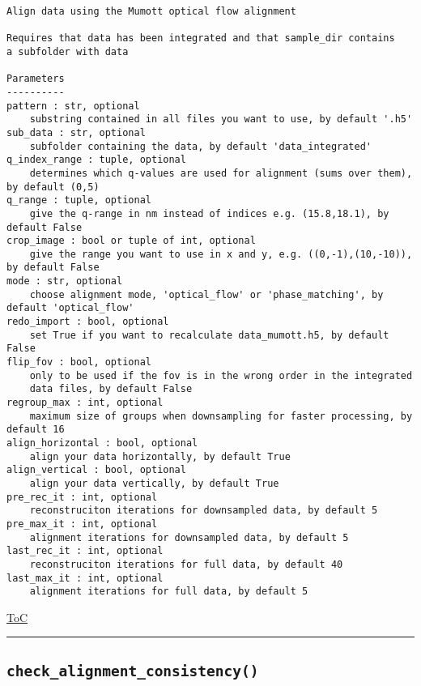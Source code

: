 \documentclass{article}
\begin{document}
\begin{lstlisting}[language=docstring]
Align data using the Mumott optical flow alignment

Requires that data has been integrated and that sample_dir contains
a subfolder with data

Parameters
----------
pattern : str, optional
    substring contained in all files you want to use, by default '.h5'
sub_data : str, optional
    subfolder containing the data, by default 'data_integrated'
q_index_range : tuple, optional
    determines which q-values are used for alignment (sums over them), by default (0,5)
q_range : tuple, optional
    give the q-range in nm instead of indices e.g. (15.8,18.1), by default False
crop_image : bool or tuple of int, optional
    give the range you want to use in x and y, e.g. ((0,-1),(10,-10)), by default False
mode : str, optional
    choose alignment mode, 'optical_flow' or 'phase_matching', by default 'optical_flow'
redo_import : bool, optional
    set True if you want to recalculate data_mumott.h5, by default False
flip_fov : bool, optional
    only to be used if the fov is in the wrong order in the integrated
    data files, by default False
regroup_max : int, optional
    maximum size of groups when downsampling for faster processing, by default 16
align_horizontal : bool, optional
    align your data horizontally, by default True
align_vertical : bool, optional
    align your data vertically, by default True
pre_rec_it : int, optional
    reconstruciton iterations for downsampled data, by default 5
pre_max_it : int, optional
    alignment iterations for downsampled data, by default 5
last_rec_it : int, optional
    reconstruciton iterations for full data, by default 40
last_max_it : int, optional
    alignment iterations for full data, by default 5
\end{lstlisting}

\begin{flushright}

\hyperref[toc]{ToC}

\end{flushright}



\vspace{5mm}

\hrule

\subsection*{\texttt{check\_alignment\_consistency()}}
\end{document}
